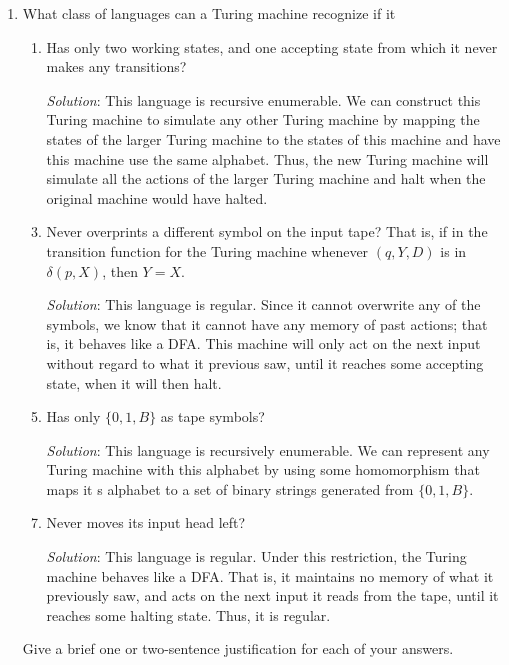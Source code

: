 \documentclass[]{article}
\begin{document}
\begin{enumerate}
\item What class of languages can a Turing machine recognize if it
\begin{enumerate}
\item Has only two working states, and one accepting state from which it never
makes any transitions?
\item[\emph{Solution}:] This language is recursive enumerable. We can construct
this Turing machine to simulate any other Turing machine by mapping the states
of the larger Turing machine to the states of this machine and have this machine
use the same alphabet. Thus, the new Turing machine will simulate all the
actions of the larger Turing machine and halt when the original machine would
have halted.

\item Never overprints a different symbol on the input tape? That is, if in the
transition function for the Turing machine whenever $(q, Y, D)$ is in
$\delta(p,X)$, then $Y = X$.
\item[\emph{Solution}:] This language is regular. Since it cannot overwrite any
of the symbols, we know that it cannot have any memory of past actions; that is,
it behaves like a DFA. This machine will only act on the next input without
regard to what it previous saw, until it reaches some accepting state, when it
will then halt.

\item Has only $\{0, 1, B\}$ as tape symbols?
\item[\emph{Solution}:] This language is recursively enumerable. We can
represent any Turing machine with this alphabet by using some homomorphism that
maps it  s alphabet to a set of binary strings generated from $\{0, 1, B\}$.

\item Never moves its input head left?
\item[\emph{Solution}:] This language is regular. Under this restriction, the
Turing machine behaves like a DFA. That is, it maintains no memory of what it
previously saw, and acts on the next input it reads from the tape, until it
reaches some halting state. Thus, it is regular.
\end{enumerate}

Give a brief one or two-sentence justification for each of your answers.
\end{enumerate}
\end{document}
